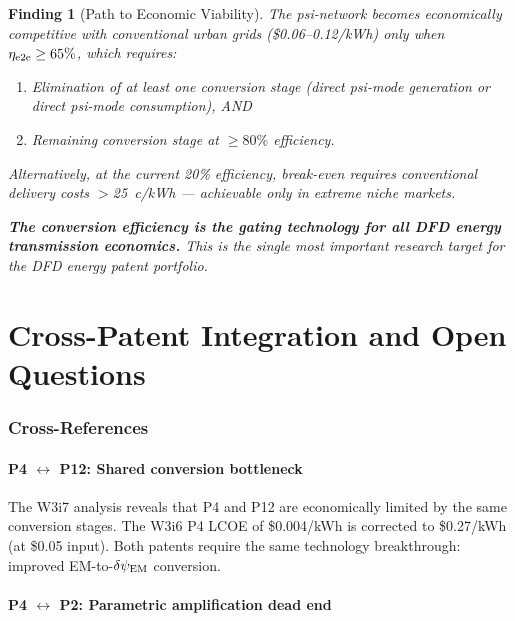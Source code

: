\documentclass[11pt]{article}
\newtheorem{finding}{Finding}
\newcommand{\dpsiEM}{\delta\psi_{\rm EM}}
\begin{document}
\begin{finding}[Path to Economic Viability]
\label{find:viability-path}
The psi-network becomes economically competitive with conventional
urban grids (\$0.06--0.12/kWh) only when $\eta_{\rm e2e} \geq 65\%$,
which requires:
\begin{enumerate}[nosep]
  \item Elimination of at least one conversion stage (direct psi-mode
    generation or direct psi-mode consumption), AND
  \item Remaining conversion stage at $\geq 80\%$ efficiency.
\end{enumerate}

Alternatively, at the current 20\% efficiency, break-even requires
conventional delivery costs $>$25~c/kWh --- achievable only in extreme
niche markets.

\textbf{The conversion efficiency is the gating technology for all DFD
energy transmission economics.} This is the single most important
research target for the DFD energy patent portfolio.
\end{finding}

\part{Cross-Patent Integration and Open Questions}
\label{part:cross}

\section{Cross-References}
\label{sec:crossrefs}

\subsection{P4 $\leftrightarrow$ P12: Shared conversion bottleneck}

The W3i7 analysis reveals that P4 and P12 are economically limited by
the same conversion stages. The W3i6 P4 LCOE of \$0.004/kWh is
corrected to \$0.27/kWh (at \$0.05 input). Both patents require the
same technology breakthrough: improved EM-to-$\dpsiEM$ conversion.

\subsection{P4 $\leftrightarrow$ P2: Parametric amplification dead end}
\end{document}
